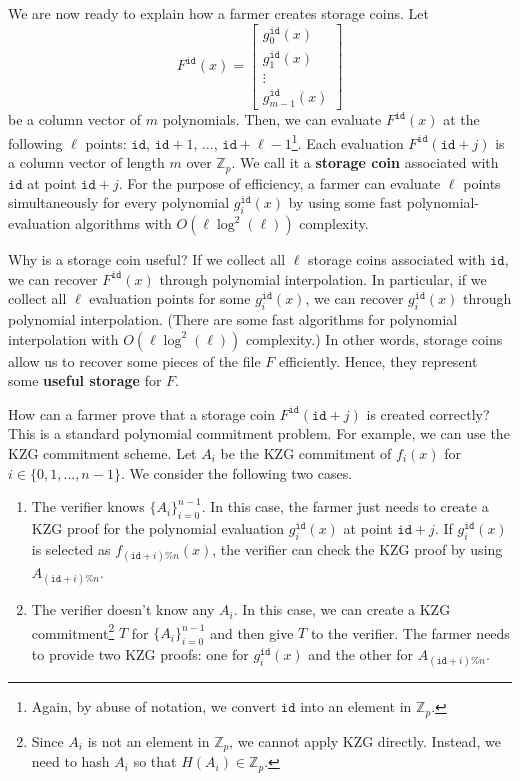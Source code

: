 \documentclass[12pt,draftcls,onecolumn]{IEEEtran}
\newcommand{\Fp}{\mathbb{Z}_p}
\newcommand{\id}{\texttt{id}}
\begin{document}
We are now ready to explain how a farmer creates storage coins. Let
\[
F^{\id}(x) = \begin{bmatrix} g_0^{\id}(x)\\ g_1^{\id}(x)\\  \vdots \\ g_{m-1}^{\id}(x) \end{bmatrix}
\]
be a column vector of $m$ polynomials. 
Then, we can evaluate $F^{\id}(x)$ at the following $\ell$ points: $\id$, $\id + 1$, $\ldots$, $\id + \ell - 1$\footnote{Again, by abuse of notation, we convert $\id$ into an element in $\Fp$.}.
Each evaluation $F^{\id}(\id + j)$ is a column vector of length $m$ over $\Fp$. We  call it a {\bf storage coin}
associated with $\id$ at point $\id + j$.
For the purpose of efficiency, a farmer can evaluate $\ell$ points simultaneously for every polynomial $g_i^{\id}(x)$
by using some fast polynomial-evaluation algorithms with $O(\ell \log^2(\ell))$ complexity.


Why is a storage coin useful? If we collect all $\ell$ storage coins associated with $\id$, we can recover $F^{\id}(x)$ through polynomial interpolation.
In particular, if we collect all $\ell$ evaluation points for some $g_i^{\id}(x)$, we can recover $g_i^{\id}(x)$ through polynomial interpolation.
(There are some fast algorithms for polynomial interpolation with $O(\ell \log^2(\ell))$ complexity.)
In other words, storage coins allow us to recover some pieces of the file $F$ efficiently. Hence, they represent some {\bf useful storage} for $F$.

How can a farmer prove that a storage coin $F^{\id}(\id + j)$ is created correctly? This is a standard polynomial commitment problem. For example, we can use the
KZG commitment scheme. Let $A_i$ be the KZG commitment of $f_i(x)$ for $i \in \{0, 1, \ldots, n-1\}$. 
We consider the following two cases.
\begin{enumerate}
    \item The verifier knows $\{ A_i \}_{i = 0}^{n - 1}$. In this case, the farmer just needs to create a KZG proof for the polynomial evaluation $g_i^{\id}(x)$ at point $\id + j$.
If $g_i^{\id}(x)$ is selected as $f_{(\id + i)\% n}(x)$, the verifier can check the KZG proof by using $A_{(\id + i)\% n}$. 
    \item The verifier doesn't know any $A_i$. In this case, we can create a KZG commitment\footnote{Since $A_i$ is not an element in $\Fp$, we cannot apply KZG directly. Instead, we need to hash $A_i$ so that $H(A_i) \in \Fp$.} $T$ for $\{ A_i \}_{i = 0}^{n - 1}$ and then give $T$ to the verifier.  The farmer needs to provide two KZG proofs: one for $g_i^{\id}(x)$ and the other for $A_{(\id + i)\% n}$.
\end{enumerate}
\end{document}

